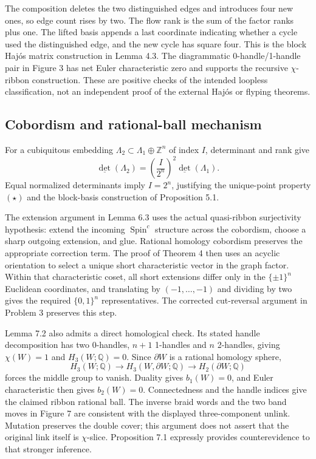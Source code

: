 \documentclass[10pt]{article}
\begin{document}
The composition deletes the two distinguished edges and introduces four new ones, so edge count rises by two. The flow rank is the sum of the factor ranks plus one. The lifted basis appends a last coordinate indicating whether a cycle used the distinguished edge, and the new cycle has square four. This is the block Hajós matrix construction in Lemma 4.3. The diagrammatic 0-handle/1-handle pair in Figure 3 has net Euler characteristic zero and supports the recursive \(\chi\)-ribbon construction. These are positive checks of the intended loopless classification, not an independent proof of the external Hajós or flyping theorems.\par
\subsection*{Cobordism and rational-ball mechanism}
For a cubiquitous embedding \(\Lambda_2\subset\Lambda_1\oplus\mathbb Z^n\) of index \(I\), determinant and rank give \[\underline{\det}(\Lambda_2)=\left(\frac I{2^n}\right)^2\underline{\det}(\Lambda_1).
 \tag{3.3}\] Equal normalized determinants imply \(I=2^n\), justifying the unique-point property \((\star)\) and the block-basis construction of Proposition 5.1.\par
The extension argument in Lemma 6.3 uses the actual quasi-ribbon surjectivity hypothesis: extend the incoming \(\operatorname{Spin}^c\) structure across the cobordism, choose a sharp outgoing extension, and glue. Rational homology cobordism preserves the appropriate correction term. The proof of Theorem 4 then uses an acyclic orientation to select a unique short characteristic vector in the graph factor. Within that characteristic coset, all short extensions differ only in the \(\{\pm1\}^n\) Euclidean coordinates, and translating by \((-1,\ldots,-1)\) and dividing by two gives the required \(\{0,1\}^n\) representatives. The corrected cut-reversal argument in Problem 3 preserves this step.\par
Lemma 7.2 also admits a direct homological check. Its stated handle decomposition has two 0-handles, \(n+1\) 1-handles and \(n\) 2-handles, giving \(\chi(W)=1\) and \(H_3(W;\mathbb Q)=0\). Since \(\partial W\) is a rational homology sphere, \[H_3(W;\mathbb Q)\longrightarrow H_3(W,\partial W;\mathbb Q)
 \longrightarrow H_2(\partial W;\mathbb Q)\] forces the middle group to vanish. Duality gives \(b_1(W)=0\), and Euler characteristic then gives \(b_2(W)=0\). Connectedness and the handle indices give the claimed ribbon rational ball. The inverse braid words and the two band moves in Figure 7 are consistent with the displayed three-component unlink. Mutation preserves the double cover; this argument does not assert that the original link itself is \(\chi\)-slice. Proposition 7.1 expressly provides counterevidence to that stronger inference.\par
\end{document}
